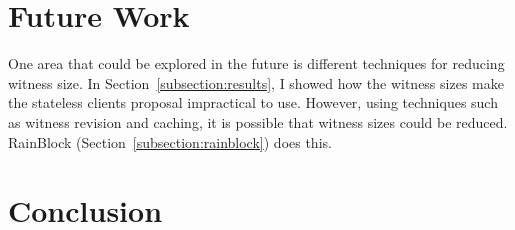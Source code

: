\documentclass[12pt]{article}
\begin{document}
\section{Future Work}

One area that could be explored in the future is different techniques for reducing witness size. In Section~\ref{subsection:results}, I showed how the witness sizes make the stateless clients proposal impractical to use. However, using techniques such as witness revision and caching, it is possible that witness sizes could be reduced. RainBlock (Section~\ref{subsection:rainblock}) does this.


\section{Conclusion}
\end{document}
